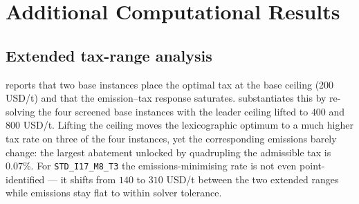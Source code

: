 
\section{Additional Computational Results}
\label{app:additional_results}

\subsection{Extended tax-range analysis}
\label{app:tax_extended}

 reports that two base instances place the optimal tax
at the base ceiling (200 USD/t) and that the emission--tax response saturates.
 substantiates this by re-solving the four screened
base instances with the leader ceiling lifted to $400$ and $800$ USD/t. Lifting the
ceiling moves the lexicographic optimum to a much higher tax rate on three of
the four instances, yet the corresponding emissions barely change: the largest
abatement unlocked by quadrupling the admissible tax is $0.07\%$. For
\texttt{STD\_I17\_M8\_T3} the emissions-minimising rate is not even
point-identified --- it shifts from $140$ to $310$ USD/t between the two extended
ranges while emissions stay flat to within solver tolerance.

